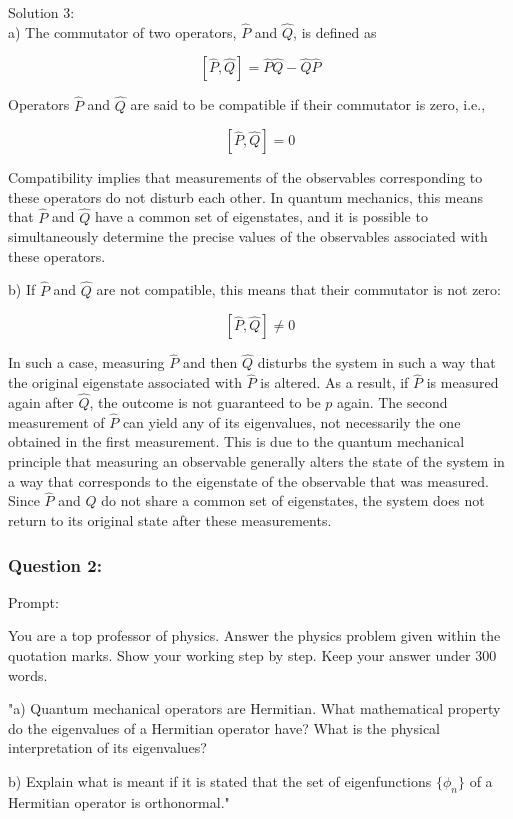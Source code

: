 \documentclass[a4paper,11pt]{article}
\begin{document}
\noindent Solution 3: \\

a) The commutator of two operators, \( \hat{P} \) and \( \hat{Q} \), is defined as

\[ [\hat{P}, \hat{Q}] = \hat{P}\hat{Q} - \hat{Q}\hat{P} \]

Operators \( \hat{P} \) and \( \hat{Q} \) are said to be compatible if their commutator is zero, i.e., 

\[ [\hat{P}, \hat{Q}] = 0 \]

Compatibility implies that measurements of the observables corresponding to these operators do not disturb each other. In quantum mechanics, this means that \( \hat{P} \) and \( \hat{Q} \) have a common set of eigenstates, and it is possible to simultaneously determine the precise values of the observables associated with these operators.

b) If \( \hat{P} \) and \( \hat{Q} \) are not compatible, this means that their commutator is not zero:

\[ [\hat{P}, \hat{Q}] \neq 0 \]

In such a case, measuring \( \hat{P} \) and then \( \hat{Q} \) disturbs the system in such a way that the original eigenstate associated with \( \hat{P} \) is altered. As a result, if \( \hat{P} \) is measured again after \( \hat{Q} \), the outcome is not guaranteed to be \( p \) again. The second measurement of \( \hat{P} \) can yield any of its eigenvalues, not necessarily the one obtained in the first measurement. This is due to the quantum mechanical principle that measuring an observable generally alters the state of the system in a way that corresponds to the eigenstate of the observable that was measured. Since \( \hat{P} \) and \( \hat{Q} \) do not share a common set of eigenstates, the system does not return to its original state after these measurements.

\subsubsection*{Question 2:}

Prompt:
\begin{spverbatim}
    You are a top professor of physics. Answer the physics problem given within the quotation marks. Show your working step by step. Keep your answer under 300 words.

    "a) Quantum mechanical operators are Hermitian. What mathematical property do the eigenvalues of a Hermitian operator have? What is the physical interpretation of its eigenvalues?

    b) Explain what is meant if it is stated that the set of eigenfunctions \( \{\phi_{n}\} \) of a Hermitian operator is orthonormal."
\end{spverbatim}
\end{document}
